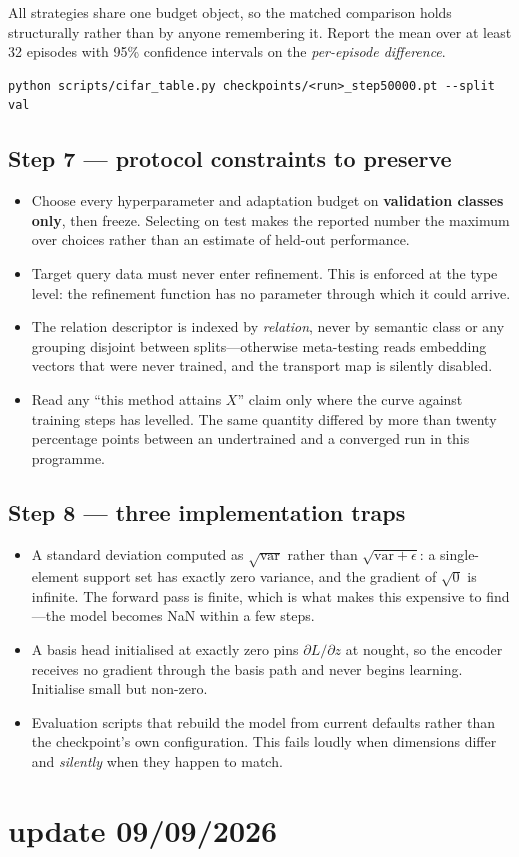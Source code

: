 \documentclass[11pt]{article}
\begin{document}
All strategies share one budget object, so the matched comparison holds structurally rather than by
anyone remembering it. Report the mean over at least 32 episodes with 95\% confidence intervals on
the \emph{per-episode difference}.

\begin{verbatim}
python scripts/cifar_table.py checkpoints/<run>_step50000.pt --split val
\end{verbatim}

\subsection*{Step 7 --- protocol constraints to preserve}

\begin{itemize}[leftmargin=*, itemsep=3pt]
\item Choose every hyperparameter and adaptation budget on \textbf{validation classes only}, then
      freeze. Selecting on test makes the reported number the maximum over choices rather than an
      estimate of held-out performance.
\item Target query data must never enter refinement. This is enforced at the type level: the
      refinement function has no parameter through which it could arrive.
\item The relation descriptor is indexed by \emph{relation}, never by semantic class or any
      grouping disjoint between splits---otherwise meta-testing reads embedding vectors that were
      never trained, and the transport map is silently disabled.
\item Read any ``this method attains $X$'' claim only where the curve against training steps has
      levelled. The same quantity differed by more than twenty percentage points between an
      undertrained and a converged run in this programme.
\end{itemize}

\subsection*{Step 8 --- three implementation traps}

\begin{itemize}[leftmargin=*, itemsep=3pt]
\item A standard deviation computed as $\sqrt{\mathrm{var}}$ rather than
      $\sqrt{\mathrm{var}+\epsilon}$: a single-element support set has exactly zero variance, and
      the gradient of $\sqrt{0}$ is infinite. The forward pass is finite, which is what makes this
      expensive to find---the model becomes NaN within a few steps.
\item A basis head initialised at exactly zero pins $\partial L/\partial z$ at nought, so the
      encoder receives no gradient through the basis path and never begins learning. Initialise
      small but non-zero.
\item Evaluation scripts that rebuild the model from current defaults rather than the checkpoint's
      own configuration. This fails loudly when dimensions differ and \emph{silently} when they
      happen to match.
\end{itemize}

\clearpage
\section*{update 09/09/2026}
\end{document}
